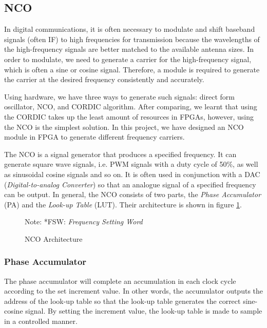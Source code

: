 \subsection{NCO}
In digital communications, it is often necessary to modulate and shift baseband signals (often IF) to high frequencies for transmission because the wavelengths of the high-frequency signals are better matched to the available antenna sizes. In order to modulate, we need to generate a carrier for the high-frequency signal, which is often a sine or cosine signal. Therefore, a module is required to generate the carrier at the desired frequency consistently and accurately.

Using hardware, we have three ways to generate such signals: direct form oscillator, NCO, and CORDIC algorithm. After comparing, we learnt that using the CORDIC takes up the least amount of resources in FPGAs\cite{RN181}, however, using the NCO is the simplest solution. In this project, we have designed an NCO module in FPGA to generate different frequency carriers.

The NCO is a signal generator that produces a specified frequency. It can generate square wave signals, i.e. PWM signals with a duty cycle of 50\%, as well as sinusoidal cosine signals and so on\cite{RN189}. It is often used in conjunction with a DAC (\textit{Digital-to-analog Converter}) so that an analogue signal of a specified frequency can be output. In general, the NCO consists of two parts, the \textit{Phase Accumulator} (PA) and the \textit{Look-up Table} (LUT)\cite{RN191-1}. Their architecture is shown in figure \ref{fig:nco}.

\begin{figure}[!h]
    \centering
    
    \caption{NCO Architecture}
    \label{fig:nco}
    \footnotesize Note: *FSW: \textit{Frequency Setting Word}
\end{figure}

\subsubsection{Phase Accumulator} \label{pa_subsubsection}
The phase accumulator will complete an accumulation in each clock cycle according to the set increment value. In other words, the accumulator outputs the address of the look-up table so that the look-up table generates the correct sine-cosine signal\cite{RN191}. By setting the increment value, the look-up table is made to sample in a controlled manner.

